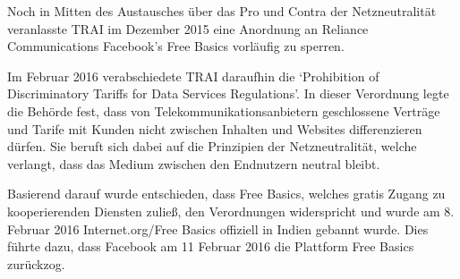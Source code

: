 \documentclass{article}
\begin{document}



Noch in Mitten des Austausches über das Pro und Contra der Netzneutralität veranlasste TRAI im Dezember 2015 eine Anordnung an Reliance Communications Facebook's Free Basics vorläufig zu sperren.
\autocite{Internet governance as 'ideology in practice' - India's 'Free Basics' controversy}

Im Februar 2016 verabschiedete TRAI daraufhin die `Prohibition of Discriminatory Tariffs for Data Services Regulations'.
In dieser Verordnung legte die Behörde fest, dass von Telekommunikationsanbietern geschlossene Verträge und Tarife mit Kunden nicht zwischen Inhalten und Websites differenzieren dürfen. Sie beruft sich dabei auf die Prinzipien der Netzneutralität, welche verlangt, dass das Medium zwischen den Endnutzern neutral bleibt.

Basierend darauf wurde entschieden, dass Free Basics, welches gratis Zugang zu kooperierenden Diensten zuließ, den
Verordnungen widerspricht und wurde am 8. Februar 2016 Internet.org/Free Basics offiziell in Indien gebannt wurde.
Dies führte dazu, dass Facebook am 11 Februar 2016 die Plattform Free Basics zurückzog.

\end{document}
